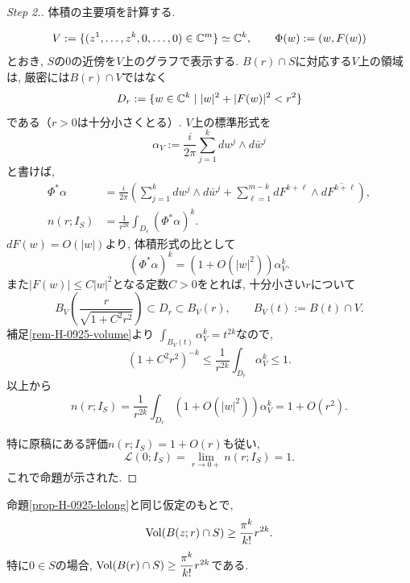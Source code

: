 \begin{proof}
[Step 2.] 体積の主要項を計算する.

\begin{equation*}
V:=\{(z^1,\ldots,z^k,0,\ldots,0)\in\mathbb{C}^m\}\simeq\mathbb{C}^k,
\qquad
\Phi(w):=(w,F(w))
\end{equation*}
とおき, $S$の$0$の近傍を$V$上のグラフで表示する.
$B(r)\cap S$に対応する$V$上の領域は, 厳密には$B(r)\cap V$ではなく
\begin{equation*}
D_r:=\{w\in\mathbb{C}^k\mid |w|^2+|F(w)|^2<r^2\}
\end{equation*}
である（$r>0$は十分小さくとる）.
$V$上の標準形式を
\begin{equation*}
\alpha_V:=\frac{i}{2\pi}\sum_{j=1}^k dw^j\wedge d\bar w^j
\end{equation*}
と書けば,
\begin{align*}
\Phi^*\alpha
&=\frac{i}{2\pi}\left(
\sum_{j=1}^k dw^j\wedge d\bar w^j
+\sum_{\ell=1}^{m-k}dF^{k+\ell}\wedge d\overline{F^{k+\ell}}
\right),\\
n(r;I_S)
&=\frac{1}{r^{2k}}\int_{D_r}(\Phi^*\alpha)^k.
\end{align*}
$dF(w)=O(|w|)$より, 体積形式の比として
\begin{equation*}
(\Phi^*\alpha)^k
=\left(1+O(|w|^2)\right)\alpha_V^k.
\end{equation*}
また$|F(w)|\leq C|w|^2$となる定数$C>0$をとれば,
十分小さい$r$について
\begin{equation*}
B_V\left(\frac{r}{\sqrt{1+C^2r^2}}\right)
\subset D_r\subset B_V(r),
\qquad B_V(t):=B(t)\cap V.
\end{equation*}
補足\ref{rem-H-0925-volume}より
$\displaystyle\int_{B_V(t)}\alpha_V^k=t^{2k}$なので,
\begin{equation*}
(1+C^2r^2)^{-k}
\leq\frac{1}{r^{2k}}\int_{D_r}\alpha_V^k\leq1.
\end{equation*}
以上から
\begin{equation*}
n(r;I_S)
=\frac{1}{r^{2k}}\int_{D_r}
\left(1+O(|w|^2)\right)\alpha_V^k
=1+O(r^2).
\end{equation*}

特に原稿にある評価$n(r;I_S)=1+O(r)$も従い,
\begin{equation*}
\mathcal{L}(0;I_S)=\lim_{r\to0+}n(r;I_S)=1.
\end{equation*}
これで命題が示された.
\end{proof}

\begin{tcolorbox}[mybox,breakable=false]
\begin{cor}[{野口--落合, (3.2.40)}]
\label{cor-H-0925-volume-lower}
命題\ref{prop-H-0925-lelong}と同じ仮定のもとで,
\begin{equation*}
\operatorname{Vol}(B(z;r)\cap S)\geq\frac{\pi^k}{k!}r^{2k}.
\end{equation*}
特に$0\in S$の場合,
$\operatorname{Vol}(B(r)\cap S)\geq\dfrac{\pi^k}{k!}r^{2k}$である.
\end{cor}
\end{tcolorbox}

